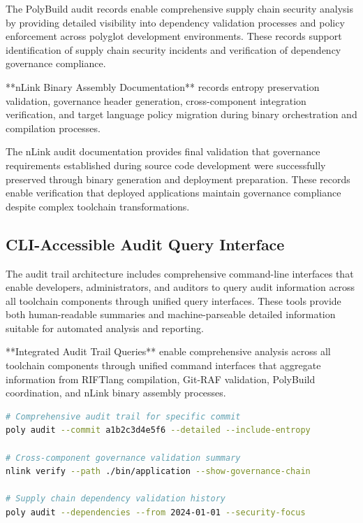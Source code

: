 The PolyBuild audit records enable comprehensive supply chain security analysis by providing detailed visibility into dependency validation processes and policy enforcement across polyglot development environments. These records support identification of supply chain security incidents and verification of dependency governance compliance.

**nLink Binary Assembly Documentation** records entropy preservation validation, governance header generation, cross-component integration verification, and target language policy migration during binary orchestration and compilation processes.

The nLink audit documentation provides final validation that governance requirements established during source code development were successfully preserved through binary generation and deployment preparation. These records enable verification that deployed applications maintain governance compliance despite complex toolchain transformations.

\subsection{CLI-Accessible Audit Query Interface}

The audit trail architecture includes comprehensive command-line interfaces that enable developers, administrators, and auditors to query audit information across all toolchain components through unified query interfaces. These tools provide both human-readable summaries and machine-parseable detailed information suitable for automated analysis and reporting.

**Integrated Audit Trail Queries** enable comprehensive analysis across all toolchain components through unified command interfaces that aggregate information from RIFTlang compilation, Git-RAF validation, PolyBuild coordination, and nLink binary assembly processes.

\begin{lstlisting}[style=riftlang, language=bash]
# Comprehensive audit trail for specific commit
poly audit --commit a1b2c3d4e5f6 --detailed --include-entropy

# Cross-component governance validation summary  
nlink verify --path ./bin/application --show-governance-chain

# Supply chain dependency validation history
poly audit --dependencies --from 2024-01-01 --security-focus
\end{lstlisting}

